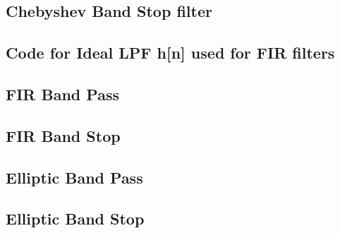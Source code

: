 \documentclass[12pt]{article}
\begin{document}


\color{darkblue}
\subsection{Chebyshev Band Stop filter}
\color{black}



\color{darkblue}
\subsection{Code for Ideal LPF h[n] used for FIR filters}
\color{black}


\color{darkblue}
\subsection{FIR Band Pass}
\color{black}


\color{darkblue}
\subsection{FIR Band Stop}
\color{black}


\color{darkblue}
\subsection{Elliptic Band Pass}
\color{black}


\color{darkblue}
\subsection{Elliptic Band Stop}
\color{black}

\end{document}
